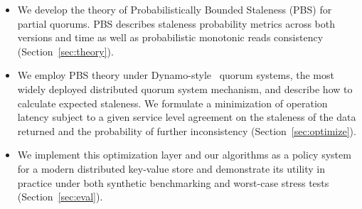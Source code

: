 \documentclass{vldb}
\begin{document}
\begin{itemize}

\item We develop the theory of Probabilistically Bounded
  Staleness (PBS) for partial quorums. PBS describes staleness
  probability metrics across both versions and time as well as
  probabilistic monotonic reads consistency
  (Section~\ref{sec:theory}).

\item We employ PBS theory under Dynamo-style~\cite{dynamo} quorum
  systems, the most widely deployed distributed quorum system
  mechanism, and describe how to calculate expected staleness.  We
  formulate a minimization of operation latency subject to a given
  service level agreement on the staleness of the data returned and
  the probability of further inconsistency
  (Section~\ref{sec:optimize}).

\item We implement this optimization layer and our algorithms as a
  policy system for a modern distributed key-value store and
  demonstrate its utility in practice under both synthetic
  benchmarking and worst-case stress tests (Section~\ref{sec:eval}).

\end{itemize}
\end{document}
